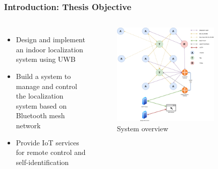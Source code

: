 \documentclass[10pt]{beamer}
\begin{document}
\begin{frame}
    \frametitle{Introduction: Thesis Objective}    
    \begin{columns}
    \begin{itemize}
        \item Design and implement an indoor localization system using UWB
        \item Build a system to manage and control the localization
        system based on Bluetooth mesh network
        \item Provide IoT services for remote control and self-identification
    \end{itemize}
    \begin{figure}[H]
        \includegraphics[width=0.8\textwidth]{system_overview.png}
        \caption{System overview}
        \label{fig:system_overview}
    \end{figure}
    \end{columns}
\end{frame}
\end{document}
